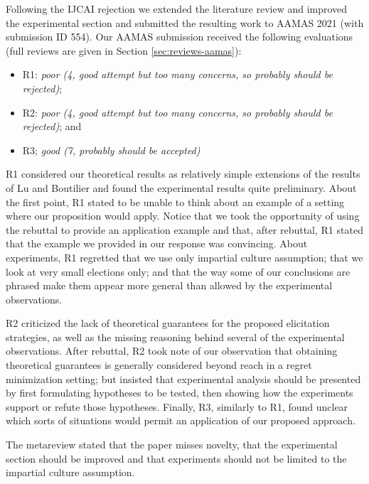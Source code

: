 \documentclass[version=3.21, pagesize, twoside=off, bibliography=totoc, DIV=calc, fontsize=12pt, a4paper]{scrartcl}
\begin{document}
\medskip
Following the IJCAI rejection we extended the literature review and improved the experimental section %
and submitted the resulting work to AAMAS 2021 (with submission ID 554). 
Our AAMAS submission received the following evaluations (full reviews are given in Section \ref{sec:reviews-aamas}):
\begin{itemize}
\item R1: {\em poor (4, good attempt but too many concerns, so probably should be rejected)};
\item R2: {\em poor (4, good attempt but too many concerns, so probably should be rejected)}; and
\item R3; {\em good (7, probably should be accepted)}
\end{itemize}
R1 considered our theoretical results as relatively simple extensions of the results of Lu and Boutilier and found the experimental results quite preliminary. About the first point, R1 stated to be unable to think about an example of a setting where our proposition would apply. 
Notice that we took the opportunity of using the rebuttal to provide an application example and that, after rebuttal, R1 stated that the example we provided in our response was convincing.
About experiments, R1 regretted that we use only impartial culture assumption; that we look at very small elections only; and that the way some of our conclusions are phrased make them appear more general than allowed by the experimental observations. 

R2 criticized the lack of theoretical guarantees for the proposed elicitation strategies, as well as the missing reasoning behind several of the experimental observations. After rebuttal, R2 took note of our observation that obtaining theoretical guarantees is generally considered beyond reach in a regret minimization setting; but insisted that experimental analysis should be presented by first formulating hypotheses to be tested, then showing how the experiments support or refute those hypotheses. Finally, R3, similarly to R1, found unclear which sorts of situations would permit an application of our proposed approach.

The metareview stated that the paper misses novelty, that the experimental section should be improved and that experiments should not be limited to the impartial culture assumption.
\end{document}
